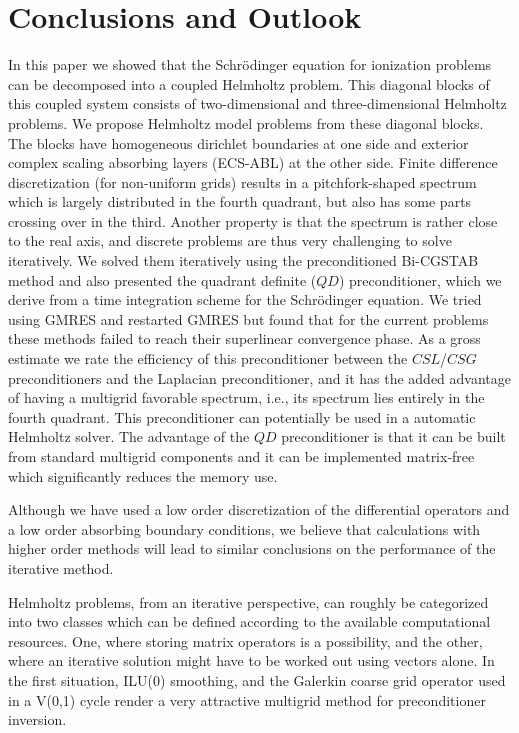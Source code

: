 \documentclass[mathpazo]{cicp}
\theoremstyle{definition}
\numberwithin{equation}{section}
\providecommand{\wv}{}
\providecommand{\edt}{}
\begin{document}
\section{Conclusions and Outlook}
\label{sec:conclude}
In this paper we showed that the Schr\"odinger equation for ionization problems can be decomposed into a coupled Helmholtz problem. This diagonal blocks of this coupled system consists of two-dimensional and three-dimensional Helmholtz problems. We propose Helmholtz model problems from these diagonal blocks. The blocks have homogeneous dirichlet boundaries at one side and exterior complex scaling absorbing layers  (ECS-ABL) at the other side. Finite difference discretization (for non-uniform grids) results in a pitchfork-shaped spectrum which is largely distributed in the fourth quadrant, but also has some parts crossing over in the third. Another property is that the spectrum is rather close to the real axis, and discrete problems are thus very challenging to solve iteratively. We solved them iteratively using the preconditioned Bi-CGSTAB method and also presented the quadrant definite ($QD$) preconditioner, which we derive from a time integration scheme for the Schr\"odinger equation. \edt{We tried using GMRES and restarted GMRES but found that for the current problems these methods failed to reach their superlinear convergence phase.} As a gross estimate we rate the efficiency of this preconditioner between the $CSL$/$CSG$  preconditioners and the Laplacian preconditioner, and it has the added advantage of having a multigrid favorable spectrum, i.e., its spectrum lies entirely in the fourth quadrant. This preconditioner can potentially be used in a automatic Helmholtz solver.  \wv{The advantage of the $QD$ preconditioner is that \edt{it} can be \edt{built} from standard multigrid components and it can be \edt{implemented} matrix-free which significantly reduces the memory use}.

\wv{Although we have used a low order discretization  of the differential operators and a low order absorbing boundary conditions, we believe that calculations with higher order methods will lead to \edt{similar} conclusions on the performance of the iterative method.}

Helmholtz problems, from an iterative perspective, can roughly be categorized into two classes which can be defined according to the available computational resources. One, where storing matrix operators is a possibility, and the other, where an iterative solution might have to be worked out using vectors alone. In the first situation, ILU(0) smoothing, and the Galerkin coarse grid operator used in a V(0,1) cycle render a very attractive multigrid method for preconditioner inversion. 
\end{document}
